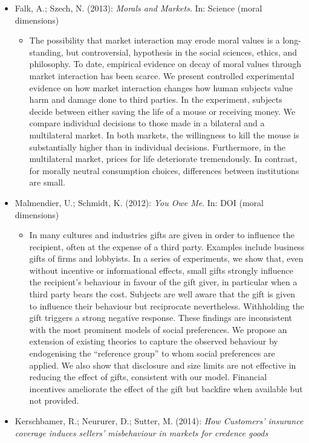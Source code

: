\begin{itemize}
	\item Falk, A.; Szech, N. (2013): \textit{Morals and Markets}. In: Science (moral dimensions)
		\begin{itemize}
			\item The possibility that market interaction may erode moral values is a long-standing, but controversial, hypothesis in the social sciences, ethics, and philosophy. To date, empirical evidence on decay of moral values through market interaction has been scarce. We present controlled experimental evidence on how market interaction changes how human subjects value harm and damage done to third parties. In the experiment, subjects decide between either saving the life of a mouse or receiving money. We compare individual decisions to those made in a bilateral and a multilateral market. In both markets, the willingness to kill the mouse is substantially higher than in individual decisions. Furthermore, in the multilateral market, prices for life deteriorate tremendously. In contrast, for morally neutral consumption choices, differences between institutions are small.
		\end{itemize}
	\item Malmendier, U.; Schmidt, K. (2012): \textit{You Owe Me}. In: DOI (moral dimensions)
		\begin{itemize}
			\item In many cultures and industries gifts are given in order to influence the recipient, often at the expense of a third party. Examples include business gifts of firms and lobbyists. In a series of experiments, we show that, even without incentive or informational effects, small gifts strongly influence the recipient’s behaviour in favour of the gift giver, in particular when a third party bears the cost. Subjects are well aware that the gift is given to influence their behaviour but reciprocate nevertheless. Withholding the gift triggers a strong negative response. These findings are inconsistent with the most prominent models of social preferences. We propose an extension of existing theories to capture the observed behaviour by endogenising the “reference group” to whom social preferences are applied. We also show that disclosure and size limits are not effective in reducing the effect of gifts, consistent with our model. Financial incentives ameliorate the effect of the gift but backfire when available but not provided.
		\end{itemize}
	\item Kerschbamer, R.; Neururer, D.; Sutter, M. (2014): \textit{How Customers' insurance coverage induces sellers' misbehaviour in markets for credence goods}

\end{itemize}
